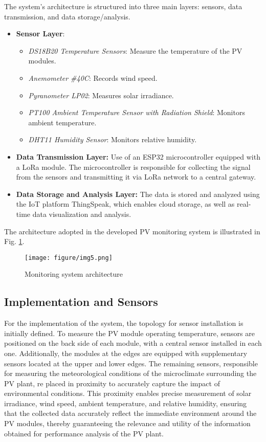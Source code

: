 \documentclass{ieeeaccess}
\begin{document}
The system's architecture is structured into three main layers: sensors, data transmission, and data storage/analysis.

\begin{itemize}
\item \textbf{Sensor Layer}: 
\begin{itemize}
    \item \textit{DS18B20 Temperature Sensors}: Measure the temperature of the PV modules.
    \item \textit{Anemometer \#40C}: Records wind speed.
    \item \textit{Pyranometer LP02}: Measures solar irradiance.
    \item \textit{PT100 Ambient Temperature Sensor with Radiation Shield}: Monitors ambient temperature.
    \item \textit{DHT11 Humidity Sensor}: Monitors relative humidity.
\end{itemize}

\item \textbf{Data Transmission Layer:} Use of an ESP32 microcontroller equipped with a LoRa module. The microcontroller is responsible for collecting the signal from the sensors and transmitting it via LoRa network to a central gateway.

\item \textbf{Data Storage and Analysis Layer:} The data is stored and analyzed using the IoT platform ThingSpeak, which enables cloud storage, as well as real-time data visualization and analysis. 

\end{itemize}

The architecture adopted in the developed PV monitoring system is illustrated in Fig. \ref{fig:exemplo}.

\begin{figure}[b]
\centering
\texttt{[image: figure/img5.png]}
\caption{Monitoring system architecture}
\label{fig:exemplo}
\end{figure}

\subsection{Implementation and Sensors}

For the implementation of the system, the topology for sensor installation is initially defined. To measure the PV module operating temperature, sensors are positioned on the back side of each module, with a central sensor installed in each one. Additionally, the modules at the edges are equipped with supplementary sensors located at the upper and lower edges. The remaining sensors, responsible for measuring the meteorological conditions of the microclimate surrounding the PV plant, re placed in proximity to accurately capture the impact of environmental conditions. This proximity enables precise measurement of solar irradiance, wind speed, ambient temperature, and relative humidity, ensuring that the collected data accurately reflect the immediate environment around the PV modules, thereby guaranteeing the relevance and utility of the information obtained for performance analysis of the PV plant. 
\end{document}
